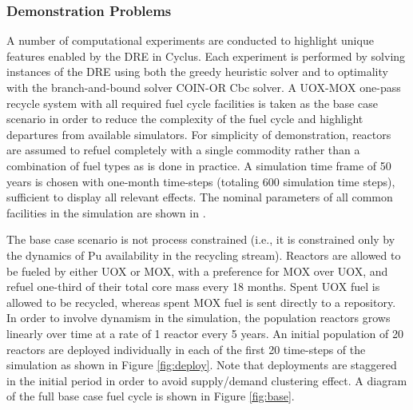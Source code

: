 
\subsubsection{Demonstration Problems}

A number of computational experiments are conducted to highlight unique
features enabled by the \gls{DRE} in Cyclus. Each experiment is performed by
solving instances of the \gls{DRE} using both the greedy heuristic solver and
to optimality with the branch-and-bound solver \gls{COIN-OR} Cbc solver. A
UOX-MOX one-pass recycle system with all required fuel cycle facilities is
taken as the base case scenario in order to reduce the complexity of the fuel
cycle and highlight departures from available simulators. For simplicity of
demonstration, reactors are assumed to refuel completely with a single
commodity rather than a combination of fuel types as is done in practice. A
simulation time frame of 50 years is chosen with one-month time-steps
(totaling 600 simulation time steps), sufficient to display all relevant
effects. The nominal parameters of all common facilities in the simulation are
shown in .

The base case scenario is not process constrained (i.e., it is constrained only
by the dynamics of Pu availability in the recycling stream). Reactors are
allowed to be fueled by either UOX or MOX, with a preference for MOX over UOX,
and refuel one-third of their total core mass every 18 months. Spent UOX fuel is
allowed to be recycled, whereas spent MOX fuel is sent directly to a
repository. In order to involve dynamism in the simulation, the population
reactors grows linearly over time at a rate of 1 reactor every 5 years. An
initial population of 20 reactors are deployed individually in each of the first
20 time-steps of the simulation as shown in Figure \ref{fig:deploy}. Note that
deployments are staggered in the initial period in order to avoid supply/demand
clustering effect. A diagram of the full base case fuel cycle is shown in Figure
\ref{fig:base}.

